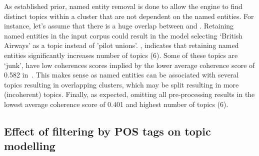 As established prior, named entity removal is done to allow the engine to find distinct topics within a cluster that are not dependent on the named entities. For instance, let's assume that there is a huge overlap between  and . Retaining named entities in the input corpus could result in the model selecting `British Airways' as a topic instead of 'pilot unions'. , indicates that retaining named entities significantly increases number of topics (6). Some of these topics are `junk', have low coherences scores implied by the lower average coherence score of 0.582 in~. This makes sense as named entities can be associated with several topics resulting in overlapping clusters, which may be split resulting in more (incoherent) topics. Finally, as expected, omitting all pre-processing results in the lowest average coherence score of 0.401 and highest number of topics (6). 

\subsection{Effect of filtering by POS tags on topic modelling} \label{s:pos_topic}

